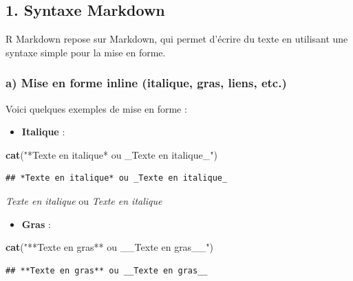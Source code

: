 \documentclass[
]{article}
\newenvironment{Shaded}{\begin{snugshade}}{\end{snugshade}}
\newcommand{\FunctionTok}[1]{\textcolor[rgb]{0.13,0.29,0.53}{\textbf{#1}}}
\newcommand{\NormalTok}[1]{#1}
\newcommand{\StringTok}[1]{\textcolor[rgb]{0.31,0.60,0.02}{#1}}
\providecommand{\tightlist}{%
  \setlength{\itemsep}{0pt}\setlength{\parskip}{0pt}}
\begin{document}
\hypertarget{syntaxe-markdown}{%
\subsection{1. Syntaxe Markdown}\label{syntaxe-markdown}}

R Markdown repose sur Markdown, qui permet d'écrire du texte en
utilisant une syntaxe simple pour la mise en forme.

\hypertarget{a-mise-en-forme-inline-italique-gras-liens-etc.}{%
\subsubsection{a) Mise en forme inline (italique, gras, liens,
etc.)}\label{a-mise-en-forme-inline-italique-gras-liens-etc.}}

Voici quelques exemples de mise en forme :

\begin{itemize}
\tightlist
\item
  \textbf{Italique} :
\end{itemize}

\begin{Shaded}
\begin{Highlighting}[]
\FunctionTok{cat}\NormalTok{(}\StringTok{"*Texte en italique* ou \_Texte en italique\_"}\NormalTok{)}
\end{Highlighting}
\end{Shaded}

\begin{verbatim}
## *Texte en italique* ou _Texte en italique_
\end{verbatim}

\emph{Texte en italique} ou \emph{Texte en italique}

\begin{itemize}
\tightlist
\item
  \textbf{Gras} :
\end{itemize}

\begin{Shaded}
\begin{Highlighting}[]
\FunctionTok{cat}\NormalTok{(}\StringTok{"**Texte en gras** ou \_\_Texte en gras\_\_"}\NormalTok{)}
\end{Highlighting}
\end{Shaded}

\begin{verbatim}
## **Texte en gras** ou __Texte en gras__
\end{verbatim}
\end{document}
